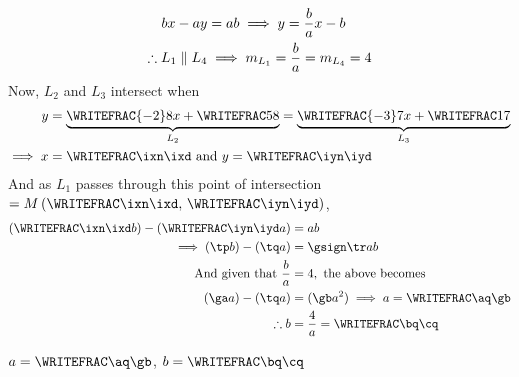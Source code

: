 \begin{solution}[\halfpage]
	\begin{align}
		bx - ay &= ab \implies y = \dfrac{b}{a}x -b \\
		\therefore L_1 \parallel L_4 &\implies m_{L_1} = \dfrac{b}{a} = m_{L_4} = 4 
	\end{align}
	Now, $L_2$ and $L_3$ intersect when 
	\begin{align}
		y &= \underbrace{\WRITEFRAC{-\va}\vb x  + \WRITEFRAC\vc\vb}_{L_2} 
		 = \underbrace{\WRITEFRAC{-\vd}\ve x + \WRITEFRAC\vf\ve}_{L_3} \\
		 \implies x &= \WRITEFRAC\ixn\ixd \text{ and } y = \WRITEFRAC\iyn\iyd
	\end{align}
	And as $L_1$ passes through this point of intersection 
	$ = M\left( \WRITEFRAC\ixn\ixd,\,\WRITEFRAC\iyn\iyd\right)$, 
	\begin{align}
		\left(\WRITEFRAC\ixn\ixd b\right) - \left( \WRITEFRAC\iyn\iyd a \right)&= ab \\
		\implies (\tp b) - (\tq a) &= \gsign\tr ab \\
		\text{And given that } \dfrac{b}{a} &= \vg, \text{ the above becomes } \\
		(\ga a) - (\tq a) &= (\gb a^2) \implies a = \WRITEFRAC\aq\gb \\
		\therefore b &= \frac{\vg}{a} = \WRITEFRAC\bq\cq
	\end{align}
\end{solution}

\ifprintanswers
  \begin{codex}
    $a=\WRITEFRAC\aq\gb$, $b=\WRITEFRAC\bq\cq$
  \end{codex}
\fi

